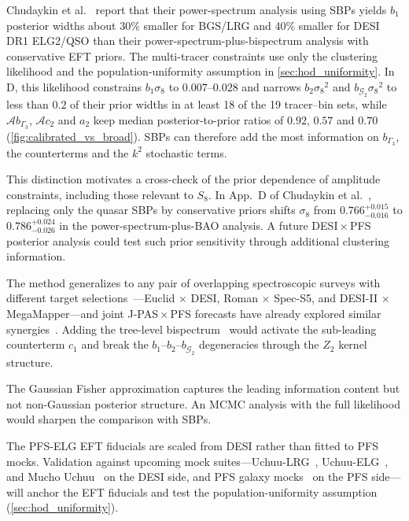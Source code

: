 \documentclass[a4paper,11pt]{article}
\newcommand{\revchange}[1]{{\color{RevisionColor}#1}}
\newcommand{\se}{\ensuremath{\sigma_{8}}\xspace}
\newcommand{\G}{\mathcal{G}}
\begin{document}
\revchange{Chudaykin et al.~\cite{Chudaykin:2026nls} report that their
power-spectrum analysis using SBPs yields $b_1$ posterior
widths about $30\%$ smaller for BGS/LRG and $40\%$
smaller for DESI DR1 ELG2/QSO than their
power-spectrum-plus-bispectrum analysis with conservative EFT priors.
The multi-tracer constraints use only the clustering likelihood
and the population-uniformity assumption in \cref{sec:hod_uniformity}.
In D, this likelihood constrains $b_1\se$ to $0.007$--$0.028$ and narrows
$b_2\se^2$ and $b_{\G_2}\se^2$ to less than $0.2$ of their prior widths in at
least 18 of the 19 tracer--bin sets, while $\mathcal A b_{\Gamma_3}$,
$\mathcal A c_2$ and $a_2$ keep median posterior-to-prior ratios of $0.92$,
$0.57$ and $0.70$ (\cref{fig:calibrated_vs_broad}). SBPs can therefore add the
most information on $b_{\Gamma_3}$, the counterterms and the $k^2$ stochastic terms.}

\revchange{This distinction motivates a cross-check of the
prior dependence of amplitude constraints, including those
relevant to $S_8$. In App.~D of
Chudaykin et al.~\cite{Chudaykin:2026nls}, replacing only the quasar
SBPs by conservative priors shifts $\se$ from
$0.766^{+0.015}_{-0.016}$ to
$0.786^{+0.024}_{-0.026}$ in the
power-spectrum-plus-BAO analysis. A future DESI\,$\times$\,PFS posterior analysis could test such prior sensitivity
through additional clustering information.}

The method generalizes to any pair of overlapping spectroscopic
surveys with different target
selections~\cite{Alarcon:2016bkr}---Euclid$\,\times\,$DESI,
Roman$\,\times\,$Spec-S5, and
DESI-II$\,\times\,$MegaMapper---and joint
J-PAS\,$\times$\,PFS forecasts have already explored similar
synergies~\cite{Qin:2025nkk}. Adding the tree-level
bispectrum~\cite{Ivanov:2023qzb,Bakx:2025pop} would activate
the sub-leading counterterm $c_1$ and break the
$b_1$--$b_2$--$b_{\G_2}$ degeneracies through the $Z_2$
kernel structure.

The Gaussian Fisher approximation captures the leading
information content but not non-Gaussian posterior structure\revchange{. An} MCMC analysis with the full likelihood would sharpen the
comparison with SBPs.

The PFS-ELG EFT fiducials are scaled from
DESI rather than fitted to PFS mocks\revchange{. Validation against upcoming}
mock suites---Uchuu-LRG~\cite{FernandezGarcia:2025rso},
Uchuu-ELG~\cite{Vaisakh:inprep}, and Mucho
Uchuu~\cite{Ishiyama:inprep} on the DESI side, and PFS galaxy
mocks~\cite{PFS-CO-mock:inprep} on the PFS side---will anchor
the EFT fiducials and \revchange{test the population-uniformity assumption}
(\cref{sec:hod_uniformity}).
\end{document}
